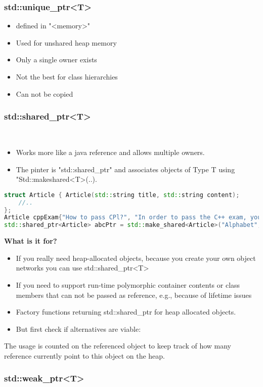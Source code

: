 \subsubsection{std::unique\_ptr<T>}
\begin{itemize}
  \itemsep -0.5em 
  \item defined in "<memory>"
  \item Used for unshared heap memory
  \item Only a single owner exists
  \item Not the best for class hierarchies
  \item Can not be copied
\end{itemize}


\subsubsection{std::shared\_ptr<T>}
\begin{itemize}
  \itemsep -0.5em 
  \item Works more like a java reference and allows multiple owners.
  \item The pinter is "std::shared\_ptr" and associates objects of Type T using "Std::makeshared<T>(..).
\end{itemize}

\begin{lstlisting}[language=C++]
struct Article { Article(std::string title, std::string content);
	//..
};
Article cppExam{"How to pass CPl?", "In order to pass the C++ exam, you have to..."};
std::shared_ptr<Article> abcPtr = std::make_shared<Article>("Alphabet", "ABCDEFGHIJKLMNOPQRSTUVXYZ");
\end{lstlisting}

\textbf{What is it for?}
\begin{itemize}
  \itemsep 0em 
  \item If you really need heap-allocated objects, because you create your own object networks you can use std::shared\_ptr<T> 
  \item  If you need to support run-time polymorphic container contents or class members that can not be passed as reference, e.g., because of lifetime issues 
  \item Factory functions returning std::shared\_ptr for heap allocated objects.
  \item  But first check if alternatives are viable:
\end{itemize}

The usage is counted on the referenced object to keep track of how many reference currently point to this object on the heap.

\subsubsection{std::weak\_ptr<T>}






